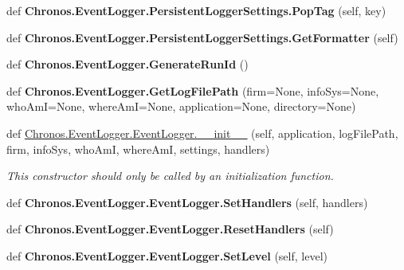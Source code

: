 \begin{DoxyCompactItemize}
\item 
def {\bfseries Chronos.\+Event\+Logger.\+Persistent\+Logger\+Settings.\+Pop\+Tag} (self, key)\hypertarget{group__PyInfrastructure_gacc2b8b76bf11f2a6562f130c57e7edc1}{}\label{group__PyInfrastructure_gacc2b8b76bf11f2a6562f130c57e7edc1}

\item 
def {\bfseries Chronos.\+Event\+Logger.\+Persistent\+Logger\+Settings.\+Get\+Formatter} (self)\hypertarget{group__PyInfrastructure_ga8f5dbbec7325d545cc8282a06ccdad63}{}\label{group__PyInfrastructure_ga8f5dbbec7325d545cc8282a06ccdad63}

\item 
def {\bfseries Chronos.\+Event\+Logger.\+Generate\+Run\+Id} ()\hypertarget{group__PyInfrastructure_ga1a49c3d343ba63edd8c4872134b0a5cf}{}\label{group__PyInfrastructure_ga1a49c3d343ba63edd8c4872134b0a5cf}

\item 
def {\bfseries Chronos.\+Event\+Logger.\+Get\+Log\+File\+Path} (firm=None, info\+Sys=None, who\+AmI=None, where\+AmI=None, application=None, directory=None)\hypertarget{group__PyInfrastructure_gab09d0208eca6abef6b23e9a6be5172b8}{}\label{group__PyInfrastructure_gab09d0208eca6abef6b23e9a6be5172b8}

\item 
def \hyperlink{group__PyInfrastructure_ga909b4948081a7832e704215ec484dea4}{Chronos.\+Event\+Logger.\+Event\+Logger.\+\_\+\+\_\+init\+\_\+\+\_\+} (self, application, log\+File\+Path, firm, info\+Sys, who\+AmI, where\+AmI, settings, handlers)
\begin{DoxyCompactList}\small\item\em This constructor should only be called by an initialization function. \end{DoxyCompactList}\item 
def {\bfseries Chronos.\+Event\+Logger.\+Event\+Logger.\+Set\+Handlers} (self, handlers)\hypertarget{group__PyInfrastructure_ga1e45b5a3753d501d90716426508de640}{}\label{group__PyInfrastructure_ga1e45b5a3753d501d90716426508de640}

\item 
def {\bfseries Chronos.\+Event\+Logger.\+Event\+Logger.\+Reset\+Handlers} (self)\hypertarget{group__PyInfrastructure_ga4bf5a78272965e5ac6336b8216f16c3c}{}\label{group__PyInfrastructure_ga4bf5a78272965e5ac6336b8216f16c3c}

\item 
def {\bfseries Chronos.\+Event\+Logger.\+Event\+Logger.\+Set\+Level} (self, level)\hypertarget{group__PyInfrastructure_ga1fec6a50d11c9494bbcee4849c85f689}{}\label{group__PyInfrastructure_ga1fec6a50d11c9494bbcee4849c85f689}


\end{DoxyCompactItemize}
